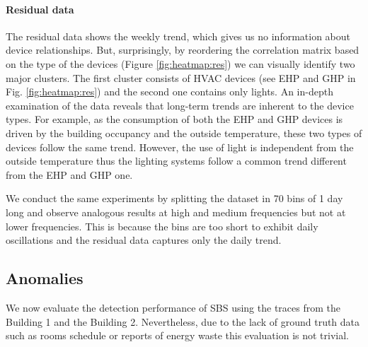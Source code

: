 \paragraph{Residual data}
The residual data shows the weekly trend, which gives us no information about device relationships.
But, surprisingly, by reordering the correlation matrix based on the type of the devices (Figure \ref{fig:heatmap:res}) 
we can visually identify two major clusters.
The first cluster consists of HVAC devices (see EHP and GHP in Fig. \ref{fig:heatmap:res}) and the second one contains only lights. 
An in-depth examination of the data reveals that long-term trends are inherent to the device types. 
For example, as the consumption of both the EHP and GHP devices is driven by the building occupancy and the outside temperature, these two types of devices follow the same trend. 
However, the use of light is independent from the outside temperature thus the lighting systems follow a common trend different from the EHP and GHP one.

We conduct the same experiments by splitting the dataset in 70 bins of 1 day long and observe analogous results at high and medium frequencies but not at lower frequencies.  This is because the bins are too short to exhibit daily oscillations and the residual data captures only the daily trend.


\subsection{Anomalies}
We now evaluate the detection performance of SBS using the traces from the Building 1 and the Building 2.
Nevertheless, due to the lack of ground truth data such as rooms schedule or reports of energy waste this evaluation is not trivial.

